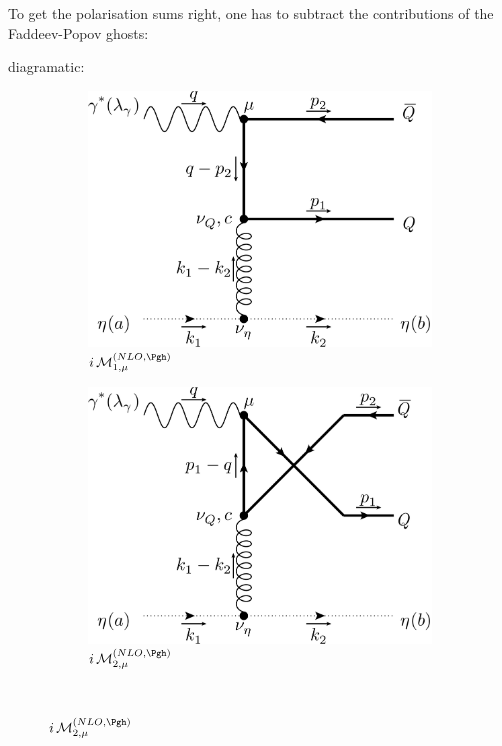 \pagebreak
To get the polarisation sums right, one has to subtract the contributions of the Faddeev-Popov ghosts\cite{FADDEEV196729,QFT}:

diagramatic:
\begin{figure}[ht!]
	\centering
	\begin{subfigure}[t]{.4\textwidth}
		\includegraphics[width=\textwidth]{pyfeyn/nlo-gh-1}
		\caption{$i\Md^{(NLO,\Pgh)}_{1,\mu}$}
	\end{subfigure}\hspace{.15\textwidth}%
	\begin{subfigure}[t]{.4\textwidth}
		\includegraphics[width=\textwidth]{pyfeyn/nlo-gh-2}
		\caption{$i\Md^{(NLO,\Pgh)}_{2,\mu}$}
	\end{subfigure}\\

\end{figure}
